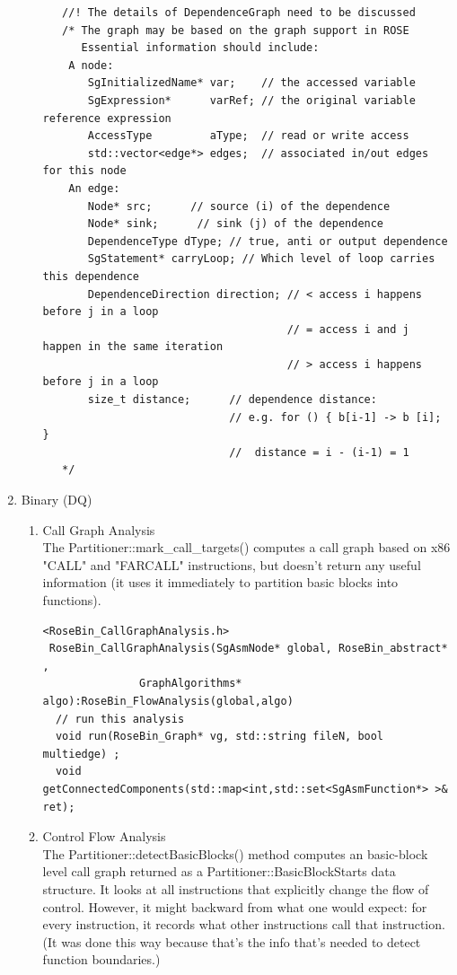 \begin{enumerate}
\begin{enumerate}
\begin{lstlisting}
   //! The details of DependenceGraph need to be discussed
   /* The graph may be based on the graph support in ROSE
      Essential information should include:
    A node: 
       SgInitializedName* var;    // the accessed variable
       SgExpression*      varRef; // the original variable reference expression 
       AccessType         aType;  // read or write access
       std::vector<edge*> edges;  // associated in/out edges for this node
    An edge:
       Node* src;      // source (i) of the dependence
       Node* sink;      // sink (j) of the dependence
       DependenceType dType; // true, anti or output dependence
       SgStatement* carryLoop; // Which level of loop carries this dependence
       DependenceDirection direction; // < access i happens before j in a loop
                                      // = access i and j happen in the same iteration
                                      // > access i happens before j in a loop
       size_t distance;      // dependence distance: 
                             // e.g. for () { b[i-1] -> b [i]; } 
                             //  distance = i - (i-1) = 1
   */ 
   \end{lstlisting}

   \end{enumerate}

   \item Binary (DQ) \\
   \begin{enumerate}
      \item Call Graph Analysis \\
      The Partitioner::mark\_call\_targets() computes a call graph
      based on x86 "CALL" and "FARCALL" instructions, but doesn't
      return any useful information (it uses it immediately to
      partition basic blocks into functions).

      \begin{lstlisting}
<RoseBin_CallGraphAnalysis.h>
 RoseBin_CallGraphAnalysis(SgAsmNode* global, RoseBin_abstract* ,
			   GraphAlgorithms* algo):RoseBin_FlowAnalysis(global,algo) 
  // run this analysis
  void run(RoseBin_Graph* vg, std::string fileN, bool multiedge) ;
  void getConnectedComponents(std::map<int,std::set<SgAsmFunction*> >& ret);

      \end{lstlisting}

      \item Control Flow Analysis \\
      The Partitioner::detectBasicBlocks() method computes an
      basic-block level call graph returned as a
      Partitioner::BasicBlockStarts data structure. It looks at all
      instructions that explicitly change the flow of
      control. However, it might backward from what one would
      expect: for every instruction, it records what other
      instructions call that instruction. (It was done this way
      because that's the info that's needed to detect function
      boundaries.)


\end{enumerate}
\end{enumerate}
